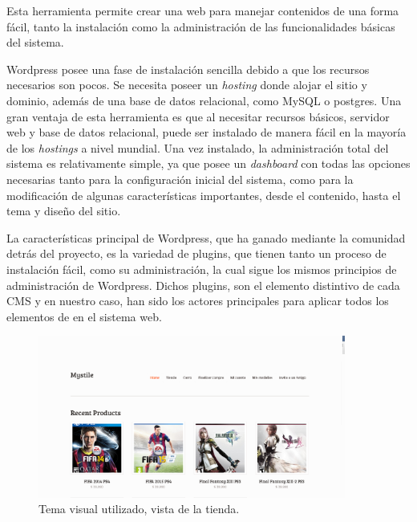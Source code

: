 Esta herramienta permite crear una web para manejar contenidos de una forma fácil,
tanto la instalación como la administración de las funcionalidades básicas del sistema.

Wordpress posee una fase de instalación sencilla debido a que los recursos
necesarios son pocos. Se necesita poseer un \emph{hosting} donde alojar el sitio y
dominio, además de una base de datos relacional, como MySQL o postgres.
Una gran ventaja de esta herramienta es que al necesitar recursos básicos,
servidor web y base de datos relacional, puede ser instalado de manera fácil en la
mayoría de los \emph{hostings} a nivel mundial.
Una vez instalado, la administración total del sistema es relativamente simple,
ya que posee un \emph{dashboard} con todas las opciones necesarias
tanto para la configuración inicial del sistema, como para la modificación
de algunas características importantes, desde el contenido, hasta el tema
y diseño del sitio.

La características principal de Wordpress, que ha ganado mediante
la comunidad detrás del proyecto, es la variedad de plugins, que
tienen tanto un proceso de instalación fácil, como su administración,
la cual sigue los mismos principios de administración de Wordpress.
Dichos plugins, son el elemento distintivo de cada CMS
y en nuestro caso, han sido los actores principales para aplicar
todos los elementos de {\GAM} en el sistema web.


\begin{figure}[!htb]
  \centering
  \includegraphics[width=0.9\textwidth]{images/SitioBase.png}
  \caption[TemaVisual]{Tema visual utilizado, vista de la tienda.}
  \label{fig:Players}
\end{figure}



